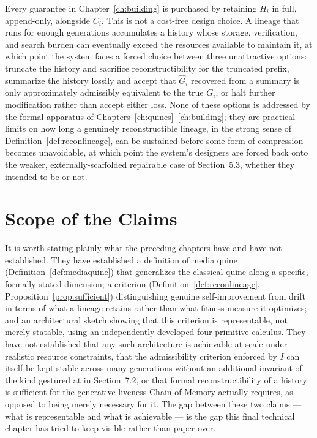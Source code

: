 \documentclass[11pt]{book}
\begin{document}
Every guarantee in Chapter~\ref{ch:building} is purchased by retaining $H_i$ in full, append-only, alongside $C_i$. This is not a cost-free design choice. A lineage that runs for enough generations accumulates a history whose storage, verification, and search burden can eventually exceed the resources available to maintain it, at which point the system faces a forced choice between three unattractive options: truncate the history and sacrifice reconstructibility for the truncated prefix, summarize the history lossily and accept that $\widehat{G}_i$ recovered from a summary is only approximately admissibly equivalent to the true $G_i$, or halt further modification rather than accept either loss. None of these options is addressed by the formal apparatus of Chapters~\ref{ch:quines}--\ref{ch:building}; they are practical limits on how long a genuinely reconstructible lineage, in the strong sense of Definition~\ref{def:reconlineage}, can be sustained before some form of compression becomes unavoidable, at which point the system's designers are forced back onto the weaker, externally-scaffolded repairable case of Section~5.3, whether they intended to be or not.

\section{Scope of the Claims}

It is worth stating plainly what the preceding chapters have and have not established. They have established a definition of media quine (Definition~\ref{def:mediaquine}) that generalizes the classical quine along a specific, formally stated dimension; a criterion (Definition~\ref{def:reconlineage}, Proposition~\ref{prop:sufficient}) distinguishing genuine self-improvement from drift in terms of what a lineage retains rather than what fitness measure it optimizes; and an architectural sketch showing that this criterion is representable, not merely statable, using an independently developed four-primitive calculus. They have not established that any such architecture is achievable at scale under realistic resource constraints, that the admissibility criterion enforced by $I$ can itself be kept stable across many generations without an additional invariant of the kind gestured at in Section~7.2, or that formal reconstructibility of a history is sufficient for the generative liveness Chain of Memory actually requires, as opposed to being merely necessary for it. The gap between these two claims --- what is representable and what is achievable --- is the gap this final technical chapter has tried to keep visible rather than paper over.
\end{document}
